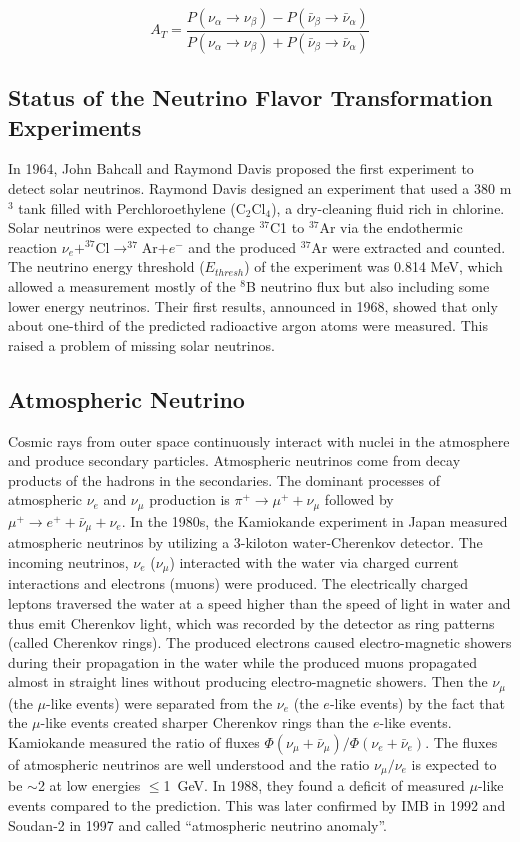 \[
A_T = \frac{P(\nu_\alpha\to\nu_\beta)-P(\bar{\nu}_\beta\to\bar{\nu}_\alpha)}{P(\nu_\alpha\to\nu_\beta)+P(\bar{\nu}_\beta\to\bar{\nu}_\alpha)}
\]

\subsection{Status of the Neutrino Flavor Transformation Experiments}
In 1964, John Bahcall and Raymond Davis proposed the first experiment to detect solar neutrinos\cite{bahcall1964solar,davis1964solar}. Raymond Davis designed an experiment that used a 380 m$^3$ tank filled with Perchloroethylene (C$_2$Cl$_4$), a dry-cleaning fluid rich in chlorine. Solar neutrinos were expected to change $^{37}$C1 to $^{37}$Ar via the endothermic reaction $\nu_e+^{37}$Cl$\to^{37}$Ar$+e^-$ and the produced $^{37}$Ar were extracted and counted. The neutrino energy threshold ($E_{thresh}$) of the experiment was 0.814 MeV, which allowed a measurement mostly of the $^8$B neutrino flux but also including some lower energy neutrinos\cite{davis1964solar}. Their first results, announced in 1968, showed that only about one-third of the predicted radioactive argon atoms were measured. This raised a problem of missing solar neutrinos.

\subsection{Atmospheric Neutrino}
Cosmic rays from outer space continuously interact with nuclei in the atmosphere and produce secondary particles. Atmospheric neutrinos come from decay products of the hadrons in the secondaries. The dominant processes of atmospheric $\nu_e$ and $\nu_\mu$ production is $\pi^+\to\mu^+ + \nu_\mu$ followed by $\mu^+ \to e^+ + \bar{\nu}_\mu + \nu_e$. In the 1980s, the Kamiokande experiment in Japan measured atmospheric neutrinos by utilizing a 3-kiloton water-Cherenkov detector. The incoming neutrinos, $\nu_e$ ($\nu_\mu$) interacted with the water via charged current interactions and electrons (muons) were produced. The electrically charged leptons traversed the water at a speed higher than the speed of light in water and thus emit Cherenkov light, which was recorded by the detector as ring patterns (called Cherenkov rings). The produced electrons caused electro-magnetic showers during their propagation in the water while the produced muons propagated almost in straight lines without producing electro-magnetic showers. Then the $\nu_\mu$ (the $\mu$-like events) were separated from the $\nu_e$ (the $e$-like events) by the fact that the $\mu$-like events created sharper Cherenkov rings than the $e$-like events. Kamiokande measured the ratio of fluxes $\Phi(\nu_\mu+\bar{\nu}_\mu)/\Phi(\nu_e+\bar{\nu}_e)$. The fluxes of atmospheric neutrinos are well understood and the ratio $\nu_\mu/\nu_e$ is expected to be $\sim$2 at low energies $\leq$1~GeV. In 1988, they found a deficit of measured $\mu$-like events compared to the prediction. This was later confirmed by IMB in 1992\cite{becker1992electron} and Soudan-2 in 1997\cite{allison1997measurement} and called ``atmospheric neutrino anomaly''\cite{kajita2012atmospheric}.



